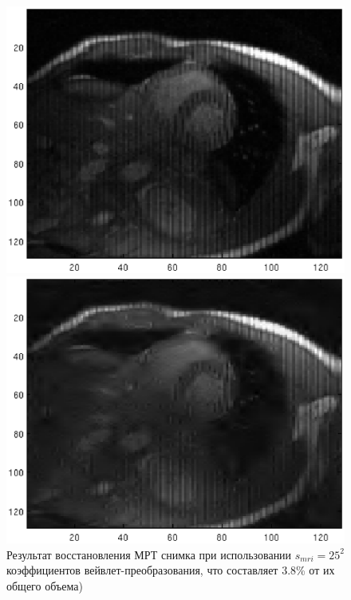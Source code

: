 \documentclass[14pt]{matmex-diploma}
\begin{document}
\begin{figure}[tbp]
  \centering
  \begin{minipage}[b]{0.45\textwidth}
    \includegraphics[width=\textwidth]{pics_eps/coef_rtv_src_img_128.eps}
  \end{minipage}
  \hfill
  \begin{minipage}[b]{0.45\textwidth}
    \includegraphics[width=\textwidth]{pics_eps/coef_rtv_result_img_128.eps}
  \end{minipage}
    \caption{Результат восстановления МРТ снимка при использовании $s_{mri}=25^2$ коэффициентов вейвлет-преобразования, что составляет 3.8\% от их общего объема)}
    \label{fig:dwt_result_on_real}
\end{figure}
\end{document}
